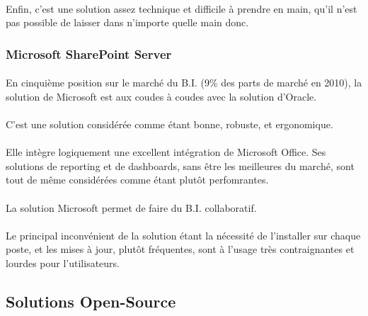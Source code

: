 \paragraph{} Enfin, c’est une solution assez technique et difficile à prendre en main, qu’il n’est pas possible de laisser dans n’importe quelle main donc.

\subsubsection{Microsoft SharePoint Server}

\paragraph{} En cinquième position sur le marché du B.I. (9\% des parts de marché en 2010), la solution de Microsoft est aux coudes à coudes avec la solution d’Oracle.

\paragraph{} C’est une solution considérée comme étant bonne, robuste, et ergonomique.

\paragraph{} Elle intègre logiquement une excellent intégration de Microsoft Office. Ses solutions de reporting et de dashboards, sans être les meilleures du marché, sont tout de même considérées comme étant plutôt perfomrantes.

\paragraph{} La solution Microsoft permet de faire du B.I. collaboratif.

\paragraph{} Le principal inconvénient de la solution étant la nécessité de l’installer sur chaque poste, et les mises à jour, plutôt fréquentes, sont à l’usage très contraignantes et lourdes pour l’utilisateurs.

\subsection{Solutions Open-Source}

